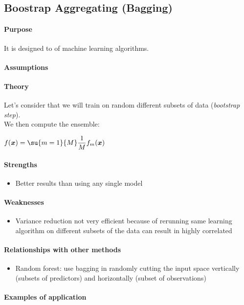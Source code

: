 \subsection{Boostrap Aggregating (Bagging)}
\paragraph{Purpose}
It is designed to  of machine learning 
algorithms.
\paragraph{Assumptions}
\paragraph{Theory}
Let's consider  that we 
will train on random different subsets of data (\emph{bootstrap step}).\\
We then compute the ensemble:
\begin{center}
    $f(\bm{x}) = \su{m=1}{M}\dfrac{1}{M}f_{m}(\bm{x})$
\end{center}

\paragraph{Strengths}
\begin{itemize}
    \item Better results than using any single model
\end{itemize}

\paragraph{Weaknesses}
\begin{itemize}
    \item Variance reduction not very efficient because of rerunning same learning
        algorithm on different subsets of the data can result in highly correlated
\end{itemize}


\paragraph{Relationships with other methods}
\begin{itemize}
    \item Random forest: use bagging in randomly cutting the input space vertically 
        (subsets of predictors) and horizontally (subset of observations)
\end{itemize}

\paragraph{Examples of application}
